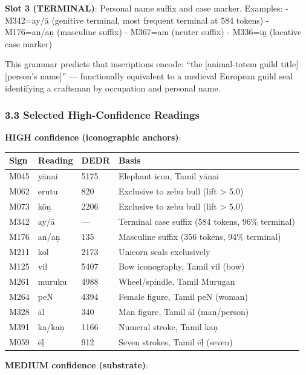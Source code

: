 \documentclass[
]{article}
\newcounter{none} %
\begin{document}
\textbf{Slot 3 (TERMINAL)}: Personal name suffix and case marker.
Examples: - M342=ay/ā (genitive terminal, most frequent terminal at 584
tokens) - M176=an/aṇ (masculine suffix) - M367=am (neuter suffix) -
M336=iṉ (locative case marker)

This grammar predicts that inscriptions encode: ``the {[}animal-totem
guild title{]} {[}person's name{]}'' --- functionally equivalent to a
medieval European guild seal identifying a craftsman by occupation and
personal name.

\subsubsection{3.3 Selected High-Confidence
Readings}\label{selected-high-confidence-readings}

\textbf{HIGH confidence (iconographic anchors)}:

{\def\LTcaptype{none} %
\begin{longtable}[]{@{}llll@{}}
\toprule\noalign{}
Sign & Reading & DEDR & Basis \\
\midrule\noalign{}
\endhead
\bottomrule\noalign{}
\endlastfoot
M045 & yānai & 5175 & Elephant icon, Tamil yānai \\
M062 & erutu & 820 & Exclusive to zebu bull (lift \textgreater{} 5.0) \\
M073 & kōṉ & 2206 & Exclusive to zebu bull (lift \textgreater{} 5.0) \\
M342 & ay/ā & --- & Terminal case suffix (584 tokens, 96\% terminal) \\
M176 & an/aṇ & 135 & Masculine suffix (356 tokens, 94\% terminal) \\
M211 & kol & 2173 & Unicorn seals exclusively \\
M125 & vil & 5407 & Bow iconography, Tamil vil (bow) \\
M261 & muruku & 4988 & Wheel/spindle, Tamil Murugan \\
M264 & peN & 4394 & Female figure, Tamil peN (woman) \\
M328 & āl & 340 & Man figure, Tamil āl (man/person) \\
M391 & ka/kaṇ & 1166 & Numeral stroke, Tamil kaṇ \\
M059 & ēḷ & 912 & Seven strokes, Tamil ēḷ (seven) \\
\end{longtable}
}

\textbf{MEDIUM confidence (substrate)}:
\end{document}
